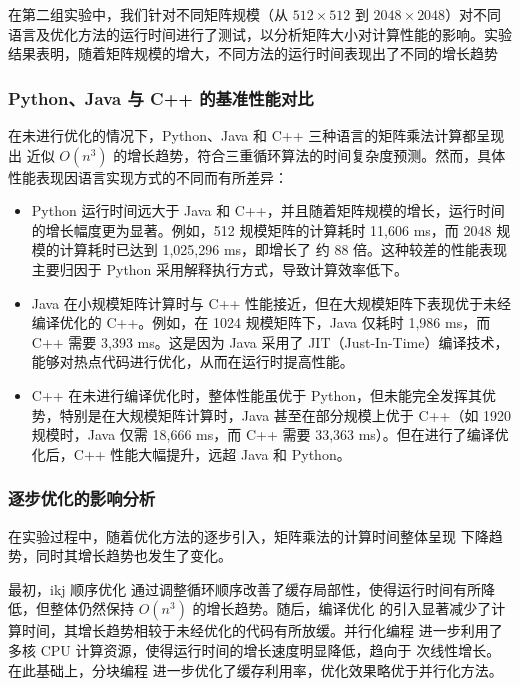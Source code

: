 \documentclass[a4paper, utf8]{ctexart}
\begin{document}
	在第二组实验中，我们针对不同矩阵规模（从 $512 \times 512$ 到 $2048 \times 2048$）对不同语言及优化方法的运行时间进行了测试，以分析矩阵大小对计算性能的影响。实验结果表明，随着矩阵规模的增大，不同方法的运行时间表现出了不同的增长趋势
	
	\subsubsection{Python、Java 与 C++ 的基准性能对比}
	
	在未进行优化的情况下，Python、Java 和 C++ 三种语言的矩阵乘法计算都呈现出 近似 $O(n^3)$ 的增长趋势，符合三重循环算法的时间复杂度预测。然而，具体性能表现因语言实现方式的不同而有所差异：
	
	\begin{itemize}[itemsep=4pt, topsep=2pt, parsep=2pt]
		\item Python 运行时间远大于 Java 和 C++，并且随着矩阵规模的增长，运行时间的增长幅度更为显著。例如，512 规模矩阵的计算耗时 11,606 ms，而 2048 规模的计算耗时已达到 1,025,296 ms，即增长了 约 88 倍。这种较差的性能表现主要归因于 Python 采用解释执行方式，导致计算效率低下。
		\item Java 在小规模矩阵计算时与 C++ 性能接近，但在大规模矩阵下表现优于未经编译优化的 C++。例如，在 1024 规模矩阵下，Java 仅耗时 1,986 ms，而 C++ 需要 3,393 ms。这是因为 Java 采用了 JIT（Just-In-Time）编译技术，能够对热点代码进行优化，从而在运行时提高性能。
		\item C++ 在未进行编译优化时，整体性能虽优于 Python，但未能完全发挥其优势，特别是在大规模矩阵计算时，Java 甚至在部分规模上优于 C++（如 1920 规模时，Java 仅需 18,666 ms，而 C++ 需要 33,363 ms）。但在进行了编译优化后，C++ 性能大幅提升，远超 Java 和 Python。
	\end{itemize}
	
	\subsubsection{逐步优化的影响分析}
	
	在实验过程中，随着优化方法的逐步引入，矩阵乘法的计算时间整体呈现 下降趋势，同时其增长趋势也发生了变化。
	
	最初，ikj 顺序优化 通过调整循环顺序改善了缓存局部性，使得运行时间有所降低，但整体仍然保持 $O(n^3)$ 的增长趋势。随后，编译优化 的引入显著减少了计算时间，其增长趋势相较于未经优化的代码有所放缓。并行化编程 进一步利用了多核 CPU 计算资源，使得运行时间的增长速度明显降低，趋向于 次线性增长。在此基础上，分块编程 进一步优化了缓存利用率，优化效果略优于并行化方法。
	
\end{document}
